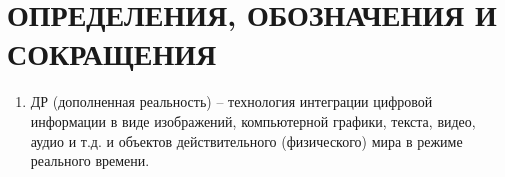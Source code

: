 \chapter*{ОПРЕДЕЛЕНИЯ, ОБОЗНАЧЕНИЯ И СОКРАЩЕНИЯ}

\begin{enumerate}
	\item ДР (дополненная реальность) -- технология интеграции цифровой информации в виде изображений, компьютерной графики, текста, видео, аудио и т.д. и объектов действительного (физического) мира в режиме реального времени.
\end{enumerate}